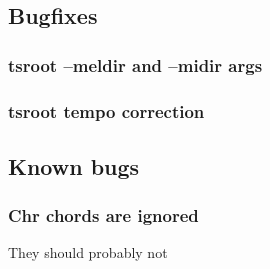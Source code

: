 	\subsection{Bugfixes}
		\subsubsection{tsroot --meldir and --midir args}
		\subsubsection{tsroot tempo correction}
	\subsection{Known bugs}
		\subsubsection{Chr chords are ignored}
    They should probably not

\newpage
